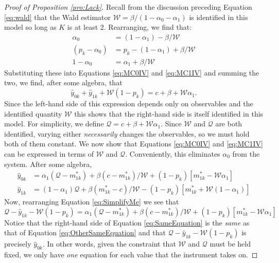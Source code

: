 \begin{proof}[Proof of Proposition \ref{pro:Lack}]
  Recall from the discussion preceding Equation \ref{eq:wald} that the Wald estimator $\mathcal{W} = \beta/(1-\alpha_0-\alpha_1)$ is identified in this model so long as $K$ is at least 2. 
  Rearranging, we find that:
  \begin{align*}
    \alpha_0 &= (1-\alpha_1) - \beta/\mathcal{W} \\
    (p_k - \alpha_0) &= p_k - (1-\alpha_1) + \beta/\mathcal{W}\\
    1 - \alpha_0 &= \alpha_1 + \beta/\mathcal{W}
  \end{align*}
Substituting these into Equations \ref{eq:MC0IV} and \ref{eq:MC1IV} and summing the two, we find, after some algebra, that
\[\hat{y}_{0k} + \hat{y}_{1k} + \mathcal{W}(1-p_k) = c + \beta + \mathcal{W} \alpha_1.\]
Since the left-hand side of this expression depends only on observables and the identified quantity $\mathcal{W}$ this shows that the right-hand side is itself identified in this model.
For simplicity, we define $\mathcal{Q} = c + \beta + \mathcal{W}\alpha_1$.
Since $\mathcal{W}$ and $\mathcal{Q}$ are both identified, varying either \emph{necessarily} changes the observables, so we must hold both of them constant. 
We now show that Equations \ref{eq:MC0IV} and \ref{eq:MC1IV} can be expressed in terms of $\mathcal{W}$ and $\mathcal{Q}$.
Conveniently, this eliminates $\alpha_0$ from the system.
After some algebra, 
\begin{align}
  \label{eq:OtherSameEquation}
  \hat{y}_{0k} &= \alpha_1 (\mathcal{Q} - m^*_{1k}) + \beta(c-m^*_{1k})/\mathcal{W} + (1-p_k)\left[m^*_{1k} - \mathcal{W}\alpha_1\right]\\
  \hat{y}_{1k} &= (1-\alpha_1) \mathcal{Q} + \beta(m^*_{1k} - c)/\mathcal{W} - (1-p_k)\left[m^*_{1k} + \mathcal{W}(1-\alpha_1)\right]
  \label{eq:SimplifyMe}
\end{align}
Now, rearranging Equation \ref{eq:SimplifyMe} we see that
\begin{equation}
  \mathcal{Q} - \hat{y}_{1k} - \mathcal{W}(1-p_k) = \alpha_1 (\mathcal{Q} - m^*_{1k}) + \beta(c-m^*_{1k})/\mathcal{W} + (1-p_k)\left[m^*_{1k} - \mathcal{W}\alpha_1\right]
  \label{eq:SameEquation}
\end{equation}
Notice that the right-hand side of Equation \ref{eq:SameEquation} is the \emph{same} as that of Equation \ref{eq:OtherSameEquation} and that $\mathcal{Q} - \hat{y}_{1k} - \mathcal{W}(1-p_k)$ is precisely $\hat{y}_{0k}$.
In other words, given the constraint that $\mathcal{W}$ and $\mathcal{Q}$ must be held fixed, we only have \emph{one} equation for each value that the instrument takes on.

\end{proof}
